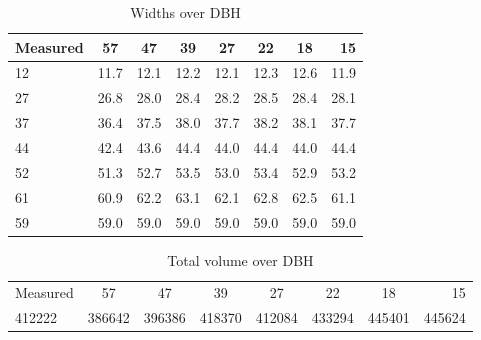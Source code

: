 \begin{table}[h!]
	\begin{center}
		\begin{tabular}{| l c c c c c c r |}
		\hline
		Measured & 57\degree & 47\degree & 39\degree & 27\degree & 22\degree & 18\degree & 15\degree \\
		\hline
		12       & 11.7      & 12.1      & 12.2      & 12.1      & 12.3      & 12.6      & 11.9      \\
		27       & 26.8      & 28.0      & 28.4      & 28.2      & 28.5      & 28.4      & 28.1      \\
		37       & 36.4      & 37.5      & 38.0      & 37.7      & 38.2      & 38.1      & 37.7      \\
		44       & 42.4      & 43.6      & 44.4      & 44.0      & 44.4      & 44.0      & 44.4      \\
		52       & 51.3      & 52.7      & 53.5      & 53.0      & 53.4      & 52.9      & 53.2      \\
		61       & 60.9      & 62.2      & 63.1      & 62.1      & 62.8      & 62.5      & 61.1      \\
		59       & 59.0      & 59.0      & 59.0      & 59.0      & 59.0      & 59.0      & 59.0      \\
		\hline
		\end{tabular}
		\caption{Widths over DBH}
		\label{widths}
    \end{center}
\end{table}

\begin{table}[h!]
	\begin{center}
    	\begin{tabular}{| l c c c c c c r |}
    	\hline
		Measured & 57\degree & 47\degree & 39\degree & 27\degree & 22\degree & 18\degree & 15\degree \\
		412222   & 386642    & 396386    & 418370    & 412084    & 433294    & 445401    & 445624    \\
		\hline
		\end{tabular}
		\caption{Total volume over DBH}
		\label{volumes}
    \end{center}
\end{table}
